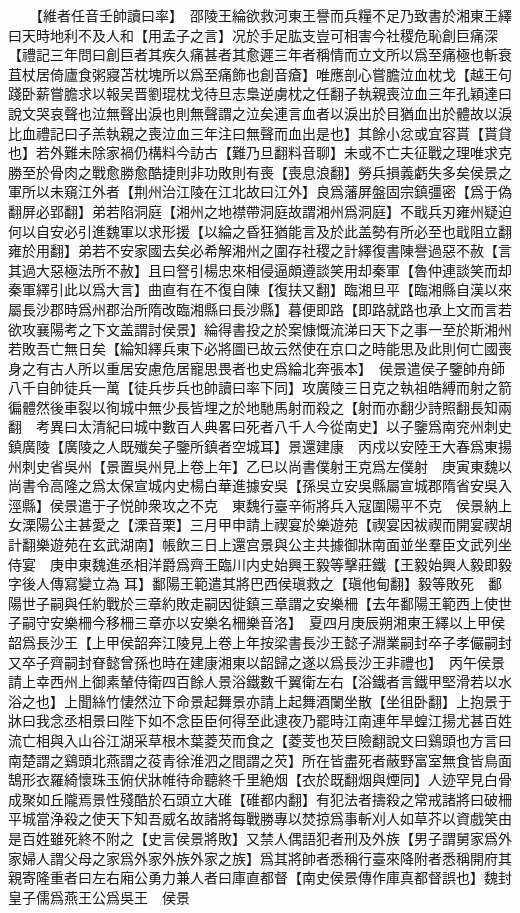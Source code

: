 　　【維者任音壬帥讀曰率】　邵陵王綸欲救河東王譽而兵糧不足乃致書於湘東王繹曰天時地利不及人和【用孟子之言】况於手足肱支豈可相害今社稷危恥創巨痛深【禮記三年問曰創巨者其疾久痛甚者其愈遲三年者稱情而立文所以爲至痛極也斬衰苴杖居倚廬食粥寢苫枕塊所以爲至痛飾也創音瘡】唯應剖心嘗膽泣血枕戈【越王句踐卧薪嘗膽求以報吴晋劉琨枕戈待旦志梟逆虜枕之任翻子執親喪泣血三年孔穎達曰說文哭哀聲也泣無聲出淚也則無聲謂之泣矣連言血者以淚出於目猶血出於體故以淚比血禮記曰子羔執親之喪泣血三年注曰無聲而血出是也】其餘小忿或宜容貰【貰貸也】若外難未除家禍仍構料今訪古【難乃旦翻料音聊】未或不亡夫征戰之理唯求克勝至於骨肉之戰愈勝愈酷捷則非功敗則有喪【喪息浪翻】勞兵損義虧失多矣侯景之軍所以未窺江外者【荆州治江陵在江北故曰江外】良爲藩屏盤固宗鎮彊密【爲于偽翻屏必郢翻】弟若陷洞庭【湘州之地襟帶洞庭故謂湘州爲洞庭】不戢兵刃雍州疑迫何以自安必引進魏軍以求形援【以綸之昏狂猶能言及於此盖勢有所必至也戢阻立翻雍於用翻】弟若不安家國去矣必希解湘州之圍存社稷之計繹復書陳譽過惡不赦【言其過大惡極法所不赦】且曰詧引楊忠來相侵逼頗遵談笑用却秦軍【魯仲連談笑而却秦軍繹引此以爲大言】曲直有在不復自陳【復扶又翻】臨湘旦平【臨湘縣自漢以來屬長沙郡時爲州郡治所隋改臨湘縣曰長沙縣】暮便即路【即路就路也承上文而言若欲攻襄陽考之下文盖謂討侯景】綸得書投之於案慷慨流涕曰天下之事一至於斯湘州若敗吾亡無日矣【綸知繹兵東下必將圖已故云然使在京口之時能思及此則何亡國喪身之有古人所以重居安慮危居寵思畏者也史爲綸北奔張本】　侯景遣侯子鑒帥舟師八千自帥徒兵一萬【徒兵步兵也帥讀曰率下同】攻廣陵三日克之執祖皓縛而射之箭徧體然後車裂以徇城中無少長皆埋之於地馳馬射而殺之【射而亦翻少詩照翻長知兩翻　考異曰太清紀曰城中數百人典畧曰死者八千人今從南史】以子鑒爲南兖州刺史鎮廣陵【廣陵之人既殱矣子鑒所鎮者空城耳】景還建康　丙戍以安陸王大春爲東揚州刺史省吳州【景置吳州見上卷上年】乙巳以尚書僕射王克爲左僕射　庚寅東魏以尚書令高隆之爲太保宣城内史楊白華進據安吳【孫吳立安吳縣屬宣城郡隋省安吳入涇縣】侯景遣于子悦帥衆攻之不克　東魏行臺辛術將兵入寇圍陽平不克　侯景納上女溧陽公主甚愛之【溧音栗】三月甲申請上禊宴於樂遊苑【禊宴因袚禊而開宴禊胡計翻樂遊苑在玄武湖南】帳飲三日上還宫景與公主共據御牀南面並坐羣臣文武列坐侍宴　庚申東魏進丞相洋爵爲齊王臨川内史始興王毅等擊莊鐵【王毅始興人毅即毅字後人傳寫變立為耳】鄱陽王範遣其將巴西侯瑱救之【瑱他甸翻】毅等敗死　鄱陽世子嗣與任約戰於三章約敗走嗣因徙鎮三章謂之安樂柵【去年鄱陽王範西上使世子嗣守安樂柵今移柵三章亦以安樂名柵樂音洛】　夏四月庚辰朔湘東王繹以上甲侯韶爲長沙王【上甲侯韶奔江陵見上卷上年按梁書長沙王懿子淵業嗣封卒子孝儼嗣封又卒子齊嗣封眘懿曾孫也時在建康湘東以韶歸之遂以爲長沙王非禮也】　丙午侯景請上幸西州上御素輦侍衛四百餘人景浴鐵數千翼衛左右【浴鐵者言鐵甲堅滑若以水浴之也】上聞絲竹悽然泣下命景起舞景亦請上起舞酒闌坐散【坐徂卧翻】上抱景于牀曰我念丞相景曰陛下如不念臣臣何得至此逮夜乃罷時江南連年旱蝗江揚尤甚百姓流亡相與入山谷江湖采草根木葉菱芡而食之【菱芰也芡巨險翻說文曰鷄頭也方言曰南楚謂之鷄頭北燕謂之䓈青徐淮泗之間謂之芡】所在皆盡死者蔽野富室無食皆鳥面鵠形衣羅綺懷珠玉俯伏牀帷待命聽終千里絶烟【衣於既翻烟與煙同】人迹罕見白骨成聚如丘隴焉景性殘酷於石頭立大碓【碓都内翻】有犯法者擣殺之常戒諸將曰破柵平城當浄殺之使天下知吾威名故諸將每戰勝專以焚掠爲事斬刈人如草芥以資戲笑由是百姓雖死終不附之【史言侯景將敗】又禁人偶語犯者刑及外族【男子謂舅家爲外家婦人謂父母之家爲外家外族外家之族】爲其將帥者悉稱行臺來降附者悉稱開府其親寄隆重者曰左右廂公勇力兼人者曰庫直都督【南史侯景傳作庫真都督誤也】魏封皇子儒爲燕王公爲吳王　侯景
